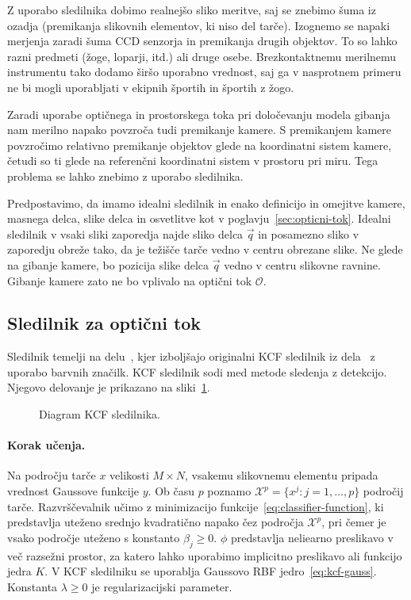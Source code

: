 Z uporabo sledilnika dobimo realnejšo sliko meritve, saj se znebimo šuma iz ozadja (premikanja slikovnih elementov, ki niso del tarče). Izognemo se napaki merjenja zaradi šuma CCD senzorja in premikanja drugih objektov. To so lahko razni predmeti (žoge, loparji, itd.) ali druge osebe. Brezkontaktnemu merilnemu instrumentu tako dodamo širšo uporabno vrednost, saj ga v nasprotnem primeru ne bi mogli uporabljati v ekipnih športih in športih z žogo. 

Zaradi uporabe optičnega in prostorskega toka pri določevanju modela gibanja nam merilno napako povzroča tudi premikanje kamere. S premikanjem kamere povzročimo relativno premikanje objektov glede na koordinatni sistem kamere, četudi so ti glede na referenčni koordinatni sistem v prostoru pri miru. Tega problema se lahko znebimo z uporabo sledilnika. 

Predpostavimo, da imamo idealni sledilnik in enako definicijo in omejitve kamere, masnega delca, slike delca in osvetlitve kot v poglavju~\ref{sec:opticni-tok}. Idealni sledilnik v vsaki sliki zaporedja najde sliko delca $\vec{q}$ in posamezno sliko v zaporedju obreže tako, da je težišče tarče vedno v centru obrezane slike. Ne glede na gibanje kamere, bo pozicija slike delca $\vec{q}$ vedno v centru slikovne ravnine. Gibanje kamere zato ne bo vplivalo na optični tok $\mathcal{O}$.



\subsection{Sledilnik za optični tok} 
Sledilnik temelji na delu~\cite{danelljan2014adaptive}, kjer izboljšajo originalni KCF sledilnik iz dela~\cite{henriques2012exploiting} z uporabo barvnih značilk. KCF sledilnik sodi med metode sledenja z detekcijo. Njegovo delovanje je prikazano na sliki~\ref{fig:diagram-kcf}.

\begin{figure}[htb]
	\centering
	\resizebox{\columnwidth}{!}{}
	\caption[Diagram KCF sledilnika]{Diagram KCF sledilnika.}
	\label{fig:diagram-kcf}
\end{figure}


\paragraph{Korak učenja.}
Na področju tarče $x$ velikosti $M \times N$, vsakemu slikovnemu elementu pripada vrednost Gaussove funkcije $y$. Ob času $p$ poznamo $\mathcal{X}^p = \{x^j: j=1,\ldots,p\}$ področij tarče. Razvrščevalnik učimo z minimizacijo funkcije~\eqref{eq:classifier-function}, ki predstavlja uteženo srednjo kvadratično napako čez področja $\mathcal{X}^p$, pri čemer je vsako področje uteženo s konstanto $\beta_j \geq 0$. $\phi$ predstavlja neliearno preslikavo v več razsežni prostor, za katero lahko uporabimo implicitno preslikavo ali funkcijo jedra $K$. V KCF sledilniku se uporablja Gaussovo RBF jedro~\eqref{eq:kcf-gauss}. Konstanta $\lambda \geq 0$ je regularizacijski parameter.

